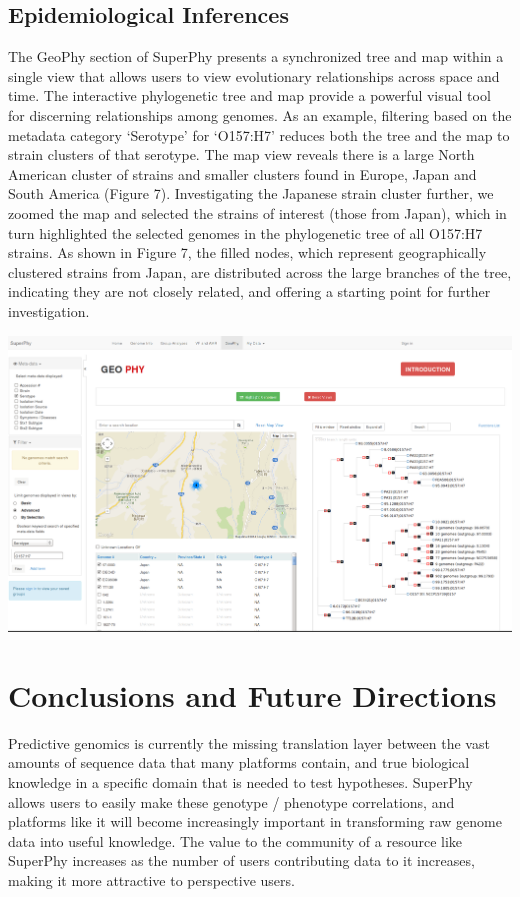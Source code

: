 \documentclass[doublespacing, linenumbers]{bmcart}
\begin{document}

\subsection{Epidemiological Inferences}
The GeoPhy section of SuperPhy presents a synchronized tree and map within a single view that allows users to view evolutionary relationships across space and time. The interactive phylogenetic tree and map provide a powerful visual tool for discerning relationships among genomes. As an example, filtering based on the metadata category `Serotype' for `O157:H7' reduces both the tree and the map to strain clusters of that serotype. The map view reveals there is a large North American cluster of strains and smaller clusters found in Europe, Japan and South America (Figure 7). Investigating the Japanese strain cluster further, we zoomed the map and selected the strains of interest (those from Japan), which in turn highlighted the selected genomes in the phylogenetic tree of all O157:H7 strains. As shown in Figure 7, the filled nodes, which represent geographically clustered strains from Japan, are distributed across the large branches of the tree, indicating they are not closely related, and offering a starting point for further investigation.

\includegraphics[width=\textwidth]{images/geophy_o157.png}

\section{Conclusions and Future Directions}
Predictive genomics is currently the missing translation layer between the vast amounts of sequence data that many platforms contain, and true biological knowledge in a specific domain that is needed to test hypotheses. SuperPhy allows users to easily make these genotype / phenotype correlations, and platforms like it will become increasingly important in transforming raw genome data into useful knowledge. The value to the community of a resource like SuperPhy increases as the number of users contributing data to it increases, making it more attractive to perspective users. 
\end{document}
